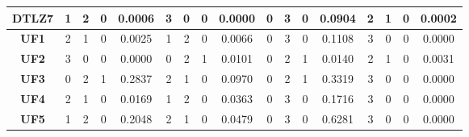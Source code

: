 \begin{table*}[t]
{\begin{tabular}{c|c|c|c|c|c|c|c|c|c|c|c|c|c|c|c|c|}
\multicolumn{1}{|c|}{\textbf{DTLZ7}} & 1                   & 2                     & 0                          & 0.0006          & 3                   & 0                     & 0                          & 0.0000          & 0                   & 3                     & 0                          & 0.0904          & 2                   & 1                     & 0                          & 0.0002          \\ \hline
\multicolumn{1}{|c|}{\textbf{UF1}}   & 2                   & 1                     & 0                          & 0.0025          & 1                   & 2                     & 0                          & 0.0066          & 0                   & 3                     & 0                          & 0.1108          & 3                   & 0                     & 0                          & 0.0000          \\ \hline
\multicolumn{1}{|c|}{\textbf{UF2}}   & 3                   & 0                     & 0                          & 0.0000          & 0                   & 2                     & 1                          & 0.0101          & 0                   & 2                     & 1                          & 0.0140          & 2                   & 1                     & 0                          & 0.0031          \\ \hline
\multicolumn{1}{|c|}{\textbf{UF3}}   & 0                   & 2                     & 1                          & 0.2837          & 2                   & 1                     & 0                          & 0.0970          & 0                   & 2                     & 1                          & 0.3319          & 3                   & 0                     & 0                          & 0.0000          \\ \hline
\multicolumn{1}{|c|}{\textbf{UF4}}   & 2                   & 1                     & 0                          & 0.0169          & 1                   & 2                     & 0                          & 0.0363          & 0                   & 3                     & 0                          & 0.1716          & 3                   & 0                     & 0                          & 0.0000          \\ \hline
\multicolumn{1}{|c|}{\textbf{UF5}}   & 1                   & 2                     & 0                          & 0.2048          & 2                   & 1                     & 0                          & 0.0479          & 0                   & 3                     & 0                          & 0.6281          & 3                   & 0                     & 0                          & 0.0000          \\ \hline

\end{tabular}}
\end{table*}
